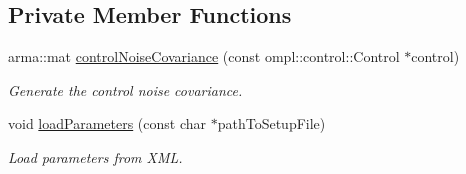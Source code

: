 \subsection*{\-Private \-Member \-Functions}
\begin{DoxyCompactItemize}
\item 
\hypertarget{class_unicycle_motion_model_acb8c6afd05d931f53d8bb7b30184b83e}{arma\-::mat \hyperlink{class_unicycle_motion_model_acb8c6afd05d931f53d8bb7b30184b83e}{control\-Noise\-Covariance} (const ompl\-::control\-::\-Control $\ast$control)}\label{class_unicycle_motion_model_acb8c6afd05d931f53d8bb7b30184b83e}

\begin{DoxyCompactList}\small\item\em \-Generate the control noise covariance. \end{DoxyCompactList}\item 
\hypertarget{class_unicycle_motion_model_ae932dca27f26105c4d91e809b304b58d}{void \hyperlink{class_unicycle_motion_model_ae932dca27f26105c4d91e809b304b58d}{load\-Parameters} (const char $\ast$path\-To\-Setup\-File)}\label{class_unicycle_motion_model_ae932dca27f26105c4d91e809b304b58d}

\begin{DoxyCompactList}\small\item\em \-Load parameters from \-X\-M\-L. \end{DoxyCompactList}\end{DoxyCompactItemize}
